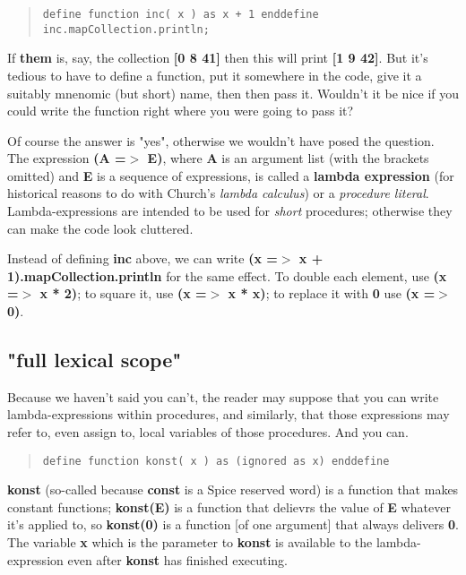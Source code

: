 \documentclass{report}
\begin{document}
\begin{quote}
\begin{verbatim}
define function inc( x ) as x + 1 enddefine
inc.mapCollection.println;
\end{verbatim}
\end{quote}
If {\bf them} is, say, the collection {\bf {[}0 8 41{]}} then this will print {\bf {[}1 9 42{]}}.
But it's tedious to have to define a function, put it
somewhere in the code, give it a suitably mnenomic (but short) name, then then
pass it. Wouldn't it be nice if you could write the function right where you
were going to pass it?

Of course the answer is "yes", otherwise we wouldn't have posed the question.
The expression {\bf (A =$>$ E)}, where {\bf A} is an argument list (with the brackets
omitted) and {\bf E} is a sequence of expressions, is called a {\bf lambda expression}
(for historical reasons to do with Church's {\em lambda calculus}) or a {\em procedure
literal}. Lambda-expressions are intended to be used for {\em short} procedures;
otherwise they can make the code look cluttered.

Instead of defining {\bf inc} above, we can write {\bf (x =$>$ x +
1).mapCollection.println} for the same effect. To double each element, use
{\bf (x =$>$ x * 2)}; to square it, use {\bf (x =$>$ x * x)}; to replace it with {\bf 0}
use {\bf (x =$>$ 0)}.

\subsection{"full lexical scope"}


Because we haven't said you can't, the reader may suppose that you can write
lambda-expressions within procedures, and similarly, that those expressions
may refer to, even assign to, local variables of those procedures. And you
can.

\begin{quote}
\begin{verbatim}
define function konst( x ) as (ignored as x) enddefine
\end{verbatim}
\end{quote}
{\bf konst} (so-called because {\bf const} is a Spice reserved word) is a function
that makes constant functions; {\bf konst(E)} is a function that delievrs the
value of {\bf E} whatever it's applied to, so {\bf konst(0)} is a function {[}of one
argument{]} that always delivers {\bf 0}. The variable {\bf x} which is the parameter to
{\bf konst} is available to the lambda-expression even after {\bf konst} has finished
executing.
\end{document}
